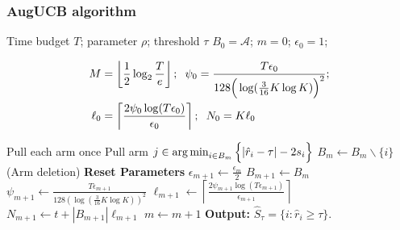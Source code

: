 \begin{frame}[allowframebreaks]
\frametitle{AugUCB algorithm}
\begin{algorithmic}
 Time budget $T$; parameter $\rho$; threshold $\tau$
 $B_{0}=\mathcal{A}$; $m=0$; $\epsilon_{0}=1$;
\begin{small}
\begin{align*}
M&=\left\lfloor \frac{1}{2}\log_{2} \frac{T}{e}\right\rfloor; 
\hspace{2mm}\psi_{0}=\frac{T\epsilon_{0}}{128\Big(\log(\frac{3}{16}K\log K)\Big)^2}; \\
\ell_{0}&=\left\lceil \frac{2\psi_0\log( T\epsilon_{0})}{\epsilon_{0}} \right\rceil ;
\hspace{2mm}N_{0}=K\ell_{0}
\end{align*}
\end{small}
\State Pull each arm once
\vspace{-3mm}
\State {}
\State Pull arm $j\in\operatorname*{arg\,min}_{i\in B_{m}}\Big\lbrace |\hat{r}_{i} - \tau | - 2s_{i}\Big\rbrace$
\vspace{-4.5mm}
\State {}
\vspace{-4.5mm}
\State {}
\State $B_m\leftarrow B_m\backslash\{i\}$\hspace{4mm} (Arm deletion)
\EndIf
\EndFor
\vspace{-2mm}
\State {}
\State \textbf{Reset Parameters}
\State $\epsilon_{m+1}\leftarrow\frac{\epsilon_{m}}{2}$
\State $B_{m+1} \leftarrow B_{m}$
\State $\psi_{m+1}\leftarrow \frac{T\epsilon_{m+1}}{128(\log(\frac{3}{16}K\log K))^{2}}$
\State $\ell_{m+1}\leftarrow\left\lceil \frac{2\psi_{m+1}\log( T\epsilon_{m+1})}{\epsilon_{m+1}} \right\rceil$
\State $N_{m+1} \leftarrow t + |B_{m+1}|\ell_{m+1}$
\State $m \leftarrow m+1$
\EndIf
\EndFor
\State \textbf{Output:} $\hat{S}_{\tau}=\lbrace i: \hat{r}_{i}\geq \tau \rbrace$.
\end{algorithmic}
\end{frame}
